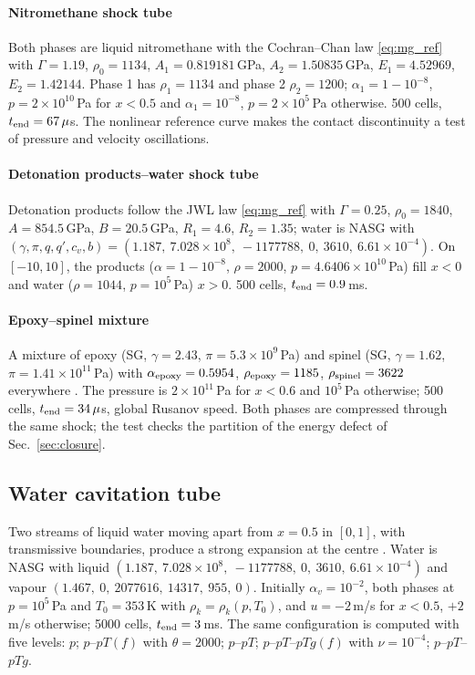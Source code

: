 \paragraph{Nitromethane shock tube}
Both phases are liquid nitromethane with the Cochran--Chan law \eqref{eq:mg_ref} \cite[Sec.~4.2]{SPB2009}
with $\Gamma=1.19$, $\rho_0=1134$, $A_1=0.819181$\,GPa, $A_2=1.50835$\,GPa, $E_1=4.52969$, $E_2=1.42144$. Phase 1 has
$\rho_1=1134$ and phase 2 $\rho_2=1200$; $\alpha_1=1-10^{-8}$, $p=2\times10^{10}$\,Pa for $x<0.5$ and $\alpha_1=10^{-8}$,
$p=2\times10^5$\,Pa otherwise. 500 cells, $t_{\rm end}=67\,\mu$s. The nonlinear reference curve makes the contact
discontinuity a test of pressure and velocity oscillations.

\paragraph{Detonation products--water shock tube}
Detonation products follow the JWL law \eqref{eq:mg_ref} \cite[Sec.~8.1.1]{Pelanti2022}
with $\Gamma=0.25$, $\rho_0=1840$, $A=854.5$\,GPa, $B=20.5$\,GPa, $R_1=4.6$, $R_2=1.35$; water is NASG with $(\gamma,\pi,q,q',c_v,b)=
(1.187,\ 7.028\times10^8,\ -1177788,\ 0,\ 3610,\ 6.61\times10^{-4})$. On $[-10,10]$, the products ($\alpha=1-10^{-8}$, $\rho=2000$,
$p=4.6406\times10^{10}$\,Pa) fill $x<0$ and water ($\rho=1044$, $p=10^5$\,Pa) $x>0$. 500 cells, $t_{\rm end}=0.9$\,ms.

\paragraph{Epoxy--spinel mixture}
A mixture of epoxy (SG, $\gamma=2.43$, $\pi=5.3\times10^9$\,Pa) and spinel (SG, $\gamma=1.62$, $\pi=1.41\times10^{11}$\,Pa) with
$\alpha_{\rm epoxy}=0.5954$, $\rho_{\rm epoxy}=1185$, $\rho_{\rm spinel}=3622$ everywhere \cite[Sec.~5.2]{SPB2009}. The pressure
is $2\times10^{11}$\,Pa for $x<0.6$ and $10^5$\,Pa otherwise; 500 cells, $t_{\rm end}=34\,\mu$s, global Rusanov speed. Both phases
are compressed through the same shock; the test checks the partition of the energy defect of Sec.~\ref{sec:closure}.

\subsection{Water cavitation tube}
\label{sec:res_cav}
Two streams of liquid water moving apart from $x=0.5$ in $[0,1]$, with transmissive boundaries, produce a strong
expansion at the centre \cite[Sec.~8.2.1]{Pelanti2022}. Water is NASG with liquid $(1.187,\ 7.028\times10^8,\ -1177788,\ 0,\ 3610,\ 6.61\times10^{-4})$
and vapour $(1.467,\ 0,\ 2077616,\ 14317,\ 955,\ 0)$. Initially $\alpha_v=10^{-2}$, both phases at $p=10^5$\,Pa and $T_0=353$\,K with
$\rho_k=\rho_k(p,T_0)$, and $u=-2$\,m/s for $x<0.5$, $+2$\,m/s otherwise; 5000 cells, $t_{\rm end}=3$\,ms. The same configuration
is computed with five levels: $p$; $p$--$pT(f)$ with $\theta=2000$; $p$--$pT$; $p$--$pT$--$pTg(f)$ with $\nu=10^{-4}$; $p$--$pT$--$pTg$.

